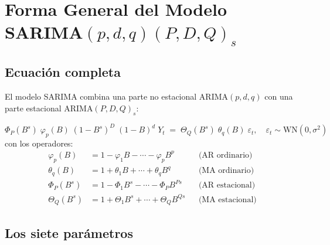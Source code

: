 \documentclass[11pt, a4paper]{article}
\newcommand{\WN}{\mathrm{WN}}
\begin{document}
\section{Forma General del Modelo SARIMA$(p,d,q)(P,D,Q)_s$}

\subsection{Ecuaci\'on completa}

El modelo SARIMA combina una parte no estacional ARIMA$(p,d,q)$ con una parte
estacional ARIMA$(P,D,Q)_s$:

\begin{tcolorbox}[formula, title={Ecuaci\'on General}]
\begin{equation}
  \Phi_P(B^s)\;\varphi_p(B)\;(1-B^s)^D\;(1-B)^d\;Y_t
  \;=\;
  \Theta_Q(B^s)\;\theta_q(B)\;\varepsilon_t,
  \quad\varepsilon_t\sim\WN(0,\sigma^2)
  \label{eq:sarima}
\end{equation}
con los operadores:
\begin{align*}
  \varphi_p(B)  &= 1-\varphi_1 B-\cdots-\varphi_p B^p
  &&\text{(AR ordinario)}\\
  \theta_q(B)   &= 1+\theta_1 B+\cdots+\theta_q B^q
  &&\text{(MA ordinario)}\\
  \Phi_P(B^s)   &= 1-\Phi_1 B^s-\cdots-\Phi_P B^{Ps}
  &&\text{(AR estacional)}\\
  \Theta_Q(B^s) &= 1+\Theta_1 B^s+\cdots+\Theta_Q B^{Qs}
  &&\text{(MA estacional)}
\end{align*}
\end{tcolorbox}

\subsection{Los siete par\'ametros}
\end{document}
